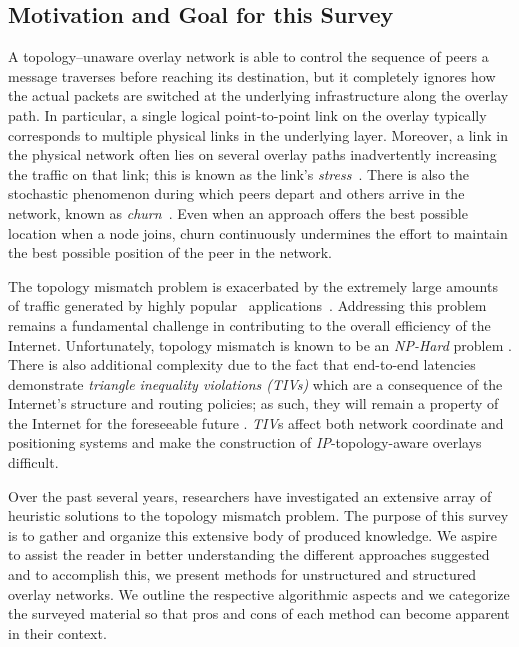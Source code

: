 \subsection{Motivation and Goal for this Survey}
\label{background:motivation}
A topology--unaware overlay network is able to control the sequence of peers a
message traverses before reaching its destination, but it completely ignores
how the actual packets are switched at the underlying infrastructure along
the overlay path. 
In particular, a single logical point-to-point link on the
overlay typically corresponds to multiple physical links in the
underlying layer. 
Moreover, a link in the physical network often lies
on several overlay paths inadvertently increasing the traffic on that
link; this is known as the link's \emph{stress}~\cite{CRSZ2002}. 
There is also the stochastic phenomenon during which peers 
depart and others arrive in the network, known 
as \emph{churn}~\cite{stutzbach_churn_2006}.
Even when an approach offers the best possible location
when a node joins, churn   
continuously undermines the effort to maintain the best possible position
of the  peer in the network.

The topology mismatch problem is exacerbated by the extremely large amounts of
traffic generated by highly popular \p\ applications~\cite{byl-book}.
Addressing this problem remains a fundamental challenge 
in contributing to the overall efficiency of the Internet. 
Unfortunately, topology mismatch is known to be 
an \emph{NP-Hard} problem \cite{C2000,NPBOOK}. 
There is also additional complexity due to the fact that 
end-to-end latencies demonstrate \emph{triangle inequality
violations (TIVs)} which are a consequence of the Internet's structure and
routing policies; as such, they will remain a property of the Internet 
for the foreseeable future \cite{zheng_irprtt_2005}. 
\emph{TIV}s affect both network coordinate
\cite{cox_vivaldi_2004,WSS2005} and positioning \cite{ng_gnp_2001}
systems and make the construction of \emph{IP}-topology-aware 
overlays difficult.

Over the past several years, researchers have investigated an extensive
array of heuristic solutions to the topology mismatch problem.
The purpose of this survey is to gather and organize
this extensive body of produced knowledge.
We aspire to assist the reader in better understanding the
different approaches suggested and to accomplish this, we
present methods for unstructured and structured
overlay networks.
We outline the respective algorithmic aspects and we categorize
the surveyed material so that pros and cons of each method
can become apparent in their context.

